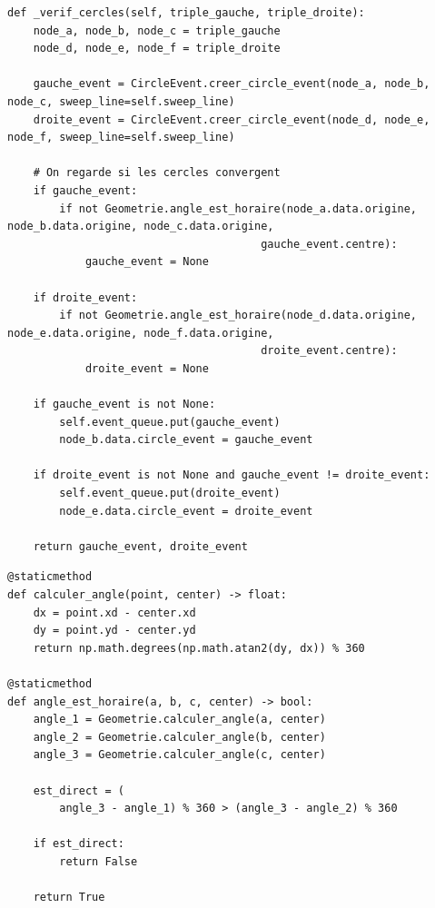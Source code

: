 \begin{frame}[fragile]
\begin{code}
\begin{verbatim}
def _verif_cercles(self, triple_gauche, triple_droite):
    node_a, node_b, node_c = triple_gauche
    node_d, node_e, node_f = triple_droite

    gauche_event = CircleEvent.creer_circle_event(node_a, node_b, node_c, sweep_line=self.sweep_line)
    droite_event = CircleEvent.creer_circle_event(node_d, node_e, node_f, sweep_line=self.sweep_line)

    # On regarde si les cercles convergent
    if gauche_event:
        if not Geometrie.angle_est_horaire(node_a.data.origine, node_b.data.origine, node_c.data.origine,
                                       gauche_event.centre):
            gauche_event = None

    if droite_event:
        if not Geometrie.angle_est_horaire(node_d.data.origine, node_e.data.origine, node_f.data.origine,
                                       droite_event.centre):
            droite_event = None

    if gauche_event is not None:
        self.event_queue.put(gauche_event)
        node_b.data.circle_event = gauche_event

    if droite_event is not None and gauche_event != droite_event:
        self.event_queue.put(droite_event)
        node_e.data.circle_event = droite_event

    return gauche_event, droite_event
\end{verbatim}
\end{code}
\end{frame}

\begin{frame}[fragile]
\begin{code}
\begin{verbatim}
@staticmethod
def calculer_angle(point, center) -> float:
    dx = point.xd - center.xd
    dy = point.yd - center.yd
    return np.math.degrees(np.math.atan2(dy, dx)) % 360

@staticmethod
def angle_est_horaire(a, b, c, center) -> bool:
    angle_1 = Geometrie.calculer_angle(a, center)
    angle_2 = Geometrie.calculer_angle(b, center)
    angle_3 = Geometrie.calculer_angle(c, center)

    est_direct = (
        angle_3 - angle_1) % 360 > (angle_3 - angle_2) % 360

    if est_direct:
        return False

    return True
\end{verbatim}
\end{code}
\end{frame}


